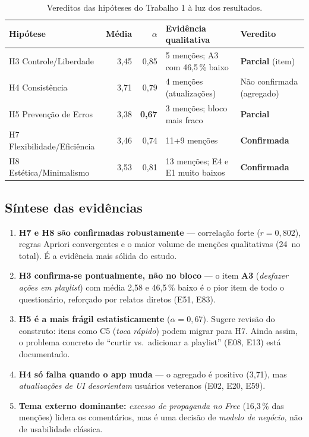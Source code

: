 \documentclass[12pt,a4paper]{article}
\begin{document}
\begin{table}[h]
\centering
\caption{Vereditos das hipóteses do Trabalho 1 à luz dos resultados.}
\label{tab:vereditos}
\footnotesize
\begin{tabularx}{\linewidth}{l r r Y l}
\toprule
\textbf{Hipótese} & \textbf{Média} & \textbf{$\alpha$} & \textbf{Evidência qualitativa} & \textbf{Veredito}\\
\midrule
H3 Controle/Liberdade   & 3{,}45 & 0{,}85 & 5 menções; A3 com 46{,}5\,\% baixo & \textbf{Parcial} (item)\\
H4 Consistência         & 3{,}71 & 0{,}79 & 4 menções (atualizações) & Não confirmada (agregado)\\
H5 Prevenção de Erros   & 3{,}38 & \textbf{0{,}67} & 3 menções; bloco mais fraco & \textbf{Parcial}\\
H7 Flexibilidade/Eficiência & 3{,}46 & 0{,}74 & 11+9 menções & \textbf{Confirmada}\\
H8 Estética/Minimalismo & 3{,}53 & 0{,}81 & 13 menções; E4 e E1 muito baixos & \textbf{Confirmada}\\
\bottomrule
\end{tabularx}
\end{table}

\subsection*{Síntese das evidências}
\begin{enumerate}[leftmargin=*, itemsep=2pt]
  \item \textbf{H7 e H8 são confirmadas robustamente} --- correlação forte ($r=0{,}802$),
        regras Apriori convergentes e o maior volume de menções qualitativas
        (24~no total). É a evidência mais sólida do estudo.
  \item \textbf{H3 confirma-se pontualmente, não no bloco} --- o item \textbf{A3}
        (\emph{desfazer ações em playlist}) com média 2{,}58 e 46{,}5\,\% baixo é o pior
        item de todo o questionário, reforçado por relatos diretos (E51, E83).
  \item \textbf{H5 é a mais frágil estatisticamente} ($\alpha = 0{,}67$). Sugere
        revisão do construto: itens como C5 (\emph{toca rápido}) podem migrar
        para H7. Ainda assim, o problema concreto de ``curtir vs.\ adicionar a
        playlist'' (E08, E13) está documentado.
  \item \textbf{H4 só falha quando o app muda} --- o agregado é positivo (3{,}71), mas
        \emph{atualizações de UI desorientam} usuários veteranos (E02, E20, E59).
  \item \textbf{Tema externo dominante:} \emph{excesso de propaganda no Free} (16{,}3\,\%
        das menções) lidera os comentários, mas é uma decisão de \emph{modelo de
        negócio}, não de usabilidade clássica.
\end{enumerate}
\end{document}
